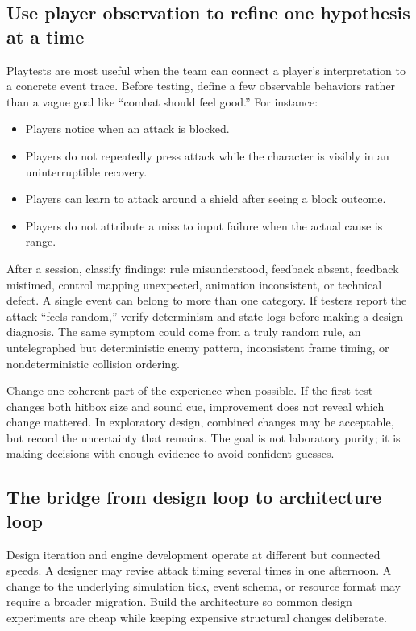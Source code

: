 \subsection{Use player observation to refine one hypothesis at a time}\label{06-engine-ii-ch041-use-player-observation-to-refine-one-hypothesis-at-a-time}

Playtests are most useful when the team can connect a player's interpretation to a concrete event trace. Before testing, define a few observable behaviors rather than a vague goal like ``combat should feel good.'' For instance:

\begin{itemize}
\tightlist
\item
  Players notice when an attack is blocked.
\item
  Players do not repeatedly press attack while the character is visibly in an uninterruptible recovery.
\item
  Players can learn to attack around a shield after seeing a block outcome.
\item
  Players do not attribute a miss to input failure when the actual cause is range.
\end{itemize}

After a session, classify findings: rule misunderstood, feedback absent, feedback mistimed, control mapping unexpected, animation inconsistent, or technical defect. A single event can belong to more than one category. If testers report the attack ``feels random,'' verify determinism and state logs before making a design diagnosis. The same symptom could come from a truly random rule, an untelegraphed but deterministic enemy pattern, inconsistent frame timing, or nondeterministic collision ordering.

Change one coherent part of the experience when possible. If the first test changes both hitbox size and sound cue, improvement does not reveal which change mattered. In exploratory design, combined changes may be acceptable, but record the uncertainty that remains. The goal is not laboratory purity; it is making decisions with enough evidence to avoid confident guesses.

\subsection{The bridge from design loop to architecture loop}\label{06-engine-ii-ch041-the-bridge-from-design-loop-to-architecture-loop}

Design iteration and engine development operate at different but connected speeds. A designer may revise attack timing several times in one afternoon. A change to the underlying simulation tick, event schema, or resource format may require a broader migration. Build the architecture so common design experiments are cheap while keeping expensive structural changes deliberate.

